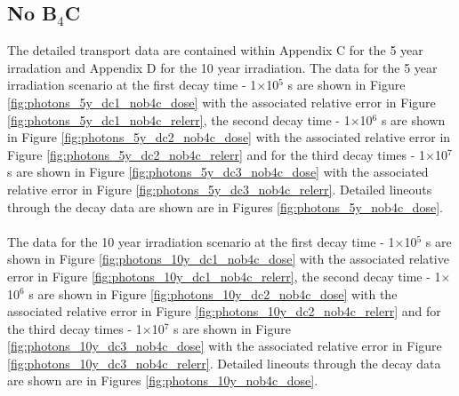 \documentclass[12pt]{article}
\begin{document}
\subsection{No B$_4$C}
The detailed transport data are contained within Appendix C for the 5 year irradation
and Appendix D for the 10 year irradiation. The data for the 5 year irradiation scenario
at the first decay time - 1$\times$10$^5$ s are shown in Figure \ref{fig:photons_5y_dc1_nob4c_dose} with the
associated relative error in Figure \ref{fig:photons_5y_dc1_nob4c_relerr}, the second
decay time - 1$\times$10$^6$ s are shown in Figure \ref{fig:photons_5y_dc2_nob4c_dose} with the
associated relative error in Figure \ref{fig:photons_5y_dc2_nob4c_relerr} and for the
third decay times - 1$\times$10$^7$ s are shown in Figure \ref{fig:photons_5y_dc3_nob4c_dose} with the
associated relative error in Figure \ref{fig:photons_5y_dc3_nob4c_relerr}. Detailed lineouts
through the decay data are shown are in Figures \ref{fig:photons_5y_nob4c_dose}.
\\
\\
The data for the 10 year irradiation scenario
at the first decay time - 1$\times$10$^5$ s are shown in Figure \ref{fig:photons_10y_dc1_nob4c_dose} with the
associated relative error in Figure \ref{fig:photons_10y_dc1_nob4c_relerr}, the second
decay time - 1$\times$10$^6$ s are shown in Figure \ref{fig:photons_10y_dc2_nob4c_dose} with the
associated relative error in Figure \ref{fig:photons_10y_dc2_nob4c_relerr} and for the
third decay times - 1$\times$10$^7$ s are shown in Figure \ref{fig:photons_10y_dc3_nob4c_dose} with the
associated relative error in Figure \ref{fig:photons_10y_dc3_nob4c_relerr}. Detailed lineouts
through the decay data are shown are in Figures \ref{fig:photons_10y_nob4c_dose}.
\newpage
\end{document}
